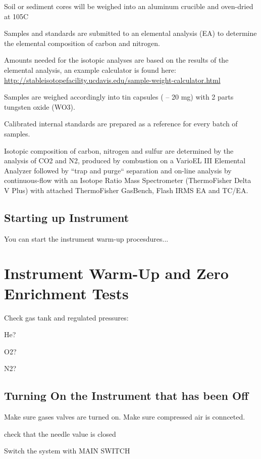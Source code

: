 \documentclass[12pt]{../SOP4_alpha}\usepackage[]{graphicx}\usepackage[]{color}
\begin{document}
\NP Soil or sediment cores will be weighed into an aluminum crucible and oven-dried at 105\degree C

\NP Samples and standards are submitted to an elemental analysis (EA) to determine the elemental composition of carbon and nitrogen. 

\NP Amounts needed for the isotopic analyses are based on the results of the elemental analysis, an example calculator is found here: \url{http://stableisotopefacility.ucdavis.edu/sample-weight-calculator.html}

\NP Samples are weighed accordingly into tin capsules ( -- 20 mg) with 2 parts tungsten oxide (WO3).

\NP Calibrated internal standards are prepared as a reference for every batch of samples.


\NP Isotopic composition of carbon, nitrogen and sulfur are determined by the analysis of CO2 and N2, produced by combustion on a VarioEL III Elemental Analyzer followed by ``trap and purge`` separation and on-line analysis by continuous-flow with an Isotope Ratio Mass Spectrometer (ThermoFisher Delta V Plus) with attached ThermoFisher GasBench, Flash IRMS EA and TC/EA. 

\subsection{Starting up Instrument}

\NP You can start the instrument warm-up procesdures... 

\section{Instrument Warm-Up and Zero Enrichment Tests}

\NP Check gas tank and regulated pressures:

He?

O2?

N2?


\subsection{Turning On the Instrument that has been Off}

\NP Make sure gases valves are turned on. Make sure compressed air is connceted.

\NP check that the needle value is closed

\NP Switch the system with MAIN SWITCH
\end{document}
